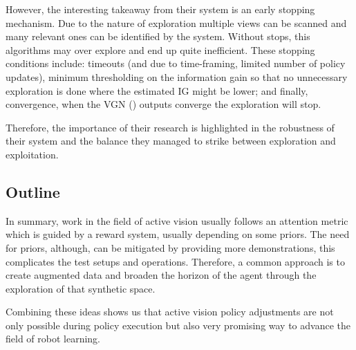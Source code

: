 However, the interesting takeaway from their system is an early stopping mechanism. Due to the nature of exploration multiple views can be scanned and many relevant ones can be identified by the system. Without stops, this algorithms may over explore and end up quite inefficient. These stopping conditions include: timeouts (and due to time-framing, limited number of policy updates), minimum thresholding on the information gain so that no unnecessary exploration is done where the estimated IG might be lower; and finally, convergence, when the VGN () outputs converge the exploration will stop. 

Therefore, the importance of their research is highlighted in the robustness of their system and the balance they managed to strike between exploration and exploitation. 


\subsection{Outline}
In summary, work in the field of active vision usually follows an attention metric which is guided by a reward system, usually depending on some priors. The need for priors, although, can be mitigated by providing more demonstrations, this complicates the test setups and operations. Therefore, a common approach is to create augmented data and broaden the horizon of the agent through the exploration of that synthetic space.

Combining these ideas shows us that active vision policy adjustments are not only possible during policy execution but also very promising way to advance the field of robot learning.



